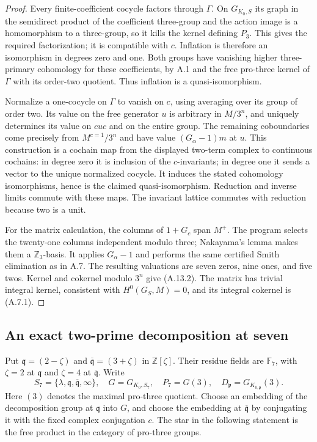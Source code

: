 \begin{proof}
Every finite-coefficient cocycle factors through $\Gamma$.
On $G_{K_0,S}$ its graph in the semidirect product of the coefficient
three-group and the action image is a homomorphism to a three-group,
so it kills the kernel defining $P_3$. This gives the required
factorization; it is compatible with $c$. Inflation is therefore
an isomorphism in degrees zero and one. Both groups have vanishing
higher three-primary cohomology for these coefficients, by A.1
and the free pro-three kernel of $\Gamma$ with its order-two
quotient. Thus inflation is a quasi-isomorphism.

Normalize a one-cocycle on $\Gamma$ to vanish on $c$, using
averaging over its group of order two. Its value on the free
generator $u$ is arbitrary in $M/3^n$, and uniquely determines
its value on $cuc$ and on the entire group. The remaining
coboundaries come precisely from $M^{c=1}/3^n$ and have value
$(G_\alpha-1)m$ at $u$. This construction is a cochain map from
the displayed two-term complex to continuous cochains: in degree
zero it is inclusion of the $c$-invariants; in degree one it sends
a vector to the unique normalized cocycle. It induces the stated
cohomology isomorphisms, hence is the claimed quasi-isomorphism.
Reduction and inverse limits commute with these maps. The invariant
lattice commutes with reduction because two is a unit.

For the matrix calculation, the columns of $1+G_c$ span $M^+$.
The program selects the twenty-one columns independent modulo three;
Nakayama's lemma makes them a $\mathbb Z_3$-basis. It applies
$G_\alpha-1$ and performs the same certified Smith elimination as
in A.7. The resulting valuations are seven zeros, nine ones,
and five twos. Kernel and cokernel modulo $3^n$ give (A.13.2).
The matrix has trivial integral kernel, consistent with
$H^0(G_S,M)=0$, and its integral cokernel is (A.7.1).
\end{proof}

\subsection{An exact two-prime decomposition at seven}

Put $\mathfrak q=(2-\zeta)$ and
$\overline{\mathfrak q}=(3+\zeta)$ in $\mathbb Z[\zeta]$.
Their residue fields are $\mathbb F_7$, with $\zeta=2$ at
$\mathfrak q$ and $\zeta=4$ at $\overline{\mathfrak q}$.
Write
\[
 S_7=\{\lambda,\mathfrak q,\overline{\mathfrak q},\infty\},
 \quad G=G_{K_0,S_7},\quad P_7=G(3),\quad
 D_{\mathfrak p}=G_{K_{0,\mathfrak p}}(3).
\]
Here $(3)$ denotes the maximal pro-three quotient. Choose an
embedding of the decomposition group at $\mathfrak q$ into $G$,
and choose the embedding at $\overline{\mathfrak q}$ by conjugating
it with the fixed complex conjugation $c$. The star in the following
statement is the free product in the category of pro-three groups.


